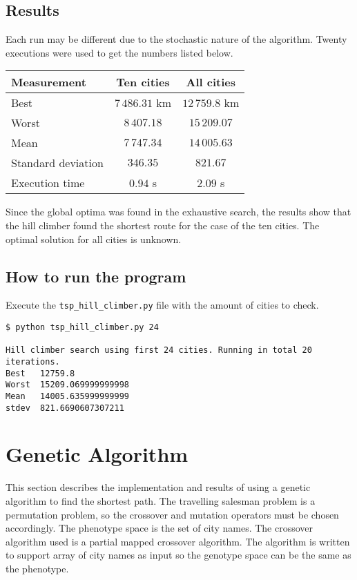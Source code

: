 \documentclass{article}
\begin{document}
\subsection*{Results}

Each run may be different due to the stochastic nature of the algorithm. Twenty executions were used to get the numbers listed below.

\begin{center}
\begin{tabular}{lcc}
\toprule
Measurement & Ten cities & All cities \\
\midrule
Best & $7\,486.31$ km & $12\,759.8$ km \\
Worst & $8\,407.18$ & $15\,209.07$ \\
Mean & $7\,747.34$ & $14\,005.63$ \\
Standard deviation & $346.35$ & $821.67$ \\
Execution time & $0.94$ s & $2.09$ s \\
\bottomrule
\end{tabular}
\end{center}

\noindent Since the global optima was found in the exhaustive search, the results show that the hill climber found the shortest route for the case of the ten cities. The optimal solution for all cities is unknown.

\subsection*{How to run the program}

Execute the \texttt{tsp\_hill\_climber.py} file with the amount of cities to check.

\begin{verbatim}
$ python tsp_hill_climber.py 24

Hill climber search using first 24 cities. Running in total 20
iterations.
Best   12759.8
Worst  15209.069999999998
Mean   14005.635999999999
stdev  821.6690607307211
\end{verbatim}

\section*{Genetic Algorithm}

This section describes the implementation and results of using a genetic algorithm to find the shortest path. The travelling salesman problem is a permutation problem, so the crossover and mutation operators must be chosen accordingly. The phenotype space is the set of city names. The crossover algorithm used is a partial mapped crossover algorithm. The algorithm is written to support array of city names as input so the genotype space can be the same as the phenotype.
\end{document}
